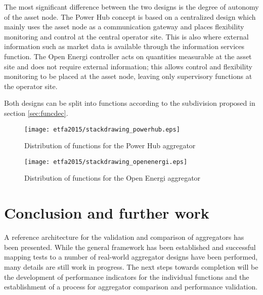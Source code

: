 The most significant difference between the two designs is the degree of autonomy of the asset node. The Power Hub concept is based on a centralized design which mainly uses the asset node as a communication gateway and places flexibility monitoring and control at the central operator site. This is also where external information such as market data is available through the information services function.
The Open Energi controller acts on quantities measurable at the asset site and does not require external information; this allows control and flexibility monitoring to be placed at the asset node, leaving only supervisory functions at the operator site.

Both designs can be split into functions according to the subdivision proposed in section \ref{sec:funcdec}.

\begin{figure}[htb]
\centering
\texttt{[image: etfa2015/stackdrawing\_powerhub.eps]}
\caption{Distribution of functions for the Power Hub aggregator}
\label{fig:powerhub}
\vspace*{-5mm}
\end{figure}
\begin{figure}[htb]
\centering
\texttt{[image: etfa2015/stackdrawing\_openenergi.eps]}
\caption{Distribution of functions for the Open Energi aggregator}
\label{fig:openenergi}
\vspace*{-5mm}
\end{figure}



\section{Conclusion and further work}
\label{sec:etfa2015:conclusion}
A reference architecture for the validation and comparison of aggregators has been presented. While the general framework has been established and successful mapping tests to a number of real-world aggregator designs have been performed, many details are still work in progress.
The next steps towards completion will be the development of performance indicators for the individual functions and the establishment of a process for aggregator comparison and performance validation.


